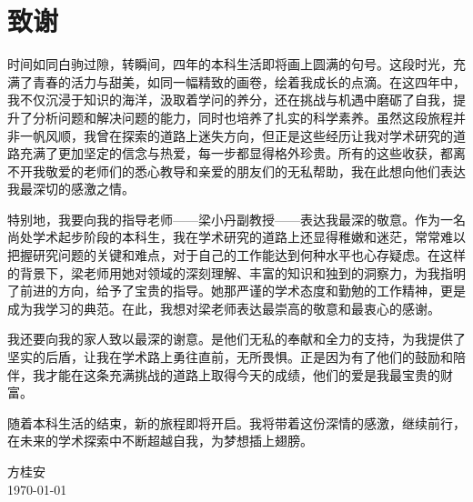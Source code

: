 
\chapter{致谢}

时间如同白驹过隙，转瞬间，四年的本科生活即将画上圆满的句号。这段时光，充满了青春的活力与甜美，如同一幅精致的画卷，绘着我成长的点滴。在这四年中，我不仅沉浸于知识的海洋，汲取着学问的养分，还在挑战与机遇中磨砺了自我，提升了分析问题和解决问题的能力，同时也培养了扎实的科学素养。虽然这段旅程并非一帆风顺，我曾在探索的道路上迷失方向，但正是这些经历让我对学术研究的道路充满了更加坚定的信念与热爱，每一步都显得格外珍贵。所有的这些收获，都离不开我敬爱的老师们的悉心教导和亲爱的朋友们的无私帮助，我在此想向他们表达我最深切的感激之情。

特别地，我要向我的指导老师——梁小丹副教授——表达我最深的敬意。作为一名尚处学术起步阶段的本科生，我在学术研究的道路上还显得稚嫩和迷茫，常常难以把握研究问题的关键和难点，对于自己的工作能达到何种水平也心存疑虑。在这样的背景下，梁老师用她对领域的深刻理解、丰富的知识和独到的洞察力，为我指明了前进的方向，给予了宝贵的指导。她那严谨的学术态度和勤勉的工作精神，更是成为我学习的典范。在此，我想对梁老师表达最崇高的敬意和最衷心的感谢。

我还要向我的家人致以最深的谢意。是他们无私的奉献和全力的支持，为我提供了坚实的后盾，让我在学术路上勇往直前，无所畏惧。正是因为有了他们的鼓励和陪伴，我才能在这条充满挑战的道路上取得今天的成绩，他们的爱是我最宝贵的财富。

随着本科生活的结束，新的旅程即将开启。我将带着这份深情的感激，继续前行，在未来的学术探索中不断超越自我，为梦想插上翅膀。
\vskip 108pt
\begin{flushright}
	方桂安\makebox[1cm]{} \\
	\today
\end{flushright}


